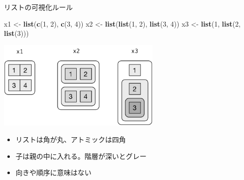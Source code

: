 \documentclass[ignorenonframetext,]{beamer}
\newenvironment{Shaded}{\begin{snugshade}}{\end{snugshade}}
\newcommand{\KeywordTok}[1]{\textcolor[rgb]{0.13,0.29,0.53}{\textbf{#1}}}
\newcommand{\DecValTok}[1]{\textcolor[rgb]{0.00,0.00,0.81}{#1}}
\newcommand{\StringTok}[1]{\textcolor[rgb]{0.31,0.60,0.02}{#1}}
\newcommand{\NormalTok}[1]{#1}
\providecommand{\tightlist}{%
  \setlength{\itemsep}{0pt}\setlength{\parskip}{0pt}}
\begin{document}
\begin{frame}[fragile]{リストの可視化ルール}

\begin{Shaded}
\begin{Highlighting}[]
\NormalTok{x1 <-}\StringTok{ }\KeywordTok{list}\NormalTok{(}\KeywordTok{c}\NormalTok{(}\DecValTok{1}\NormalTok{, }\DecValTok{2}\NormalTok{), }\KeywordTok{c}\NormalTok{(}\DecValTok{3}\NormalTok{, }\DecValTok{4}\NormalTok{))}
\NormalTok{x2 <-}\StringTok{ }\KeywordTok{list}\NormalTok{(}\KeywordTok{list}\NormalTok{(}\DecValTok{1}\NormalTok{, }\DecValTok{2}\NormalTok{), }\KeywordTok{list}\NormalTok{(}\DecValTok{3}\NormalTok{, }\DecValTok{4}\NormalTok{))}
\NormalTok{x3 <-}\StringTok{ }\KeywordTok{list}\NormalTok{(}\DecValTok{1}\NormalTok{, }\KeywordTok{list}\NormalTok{(}\DecValTok{2}\NormalTok{, }\KeywordTok{list}\NormalTok{(}\DecValTok{3}\NormalTok{)))}
\end{Highlighting}
\end{Shaded}

\begin{center}
\includegraphics[width=80mm]{../img/lists-structure.png}
\end{center}

\begin{itemize}
\tightlist
\item
  リストは角が丸、アトミックは四角
\item
  子は親の中に入れる。階層が深いとグレー
\item
  向きや順序に意味はない
\end{itemize}

\end{frame}
\end{document}
